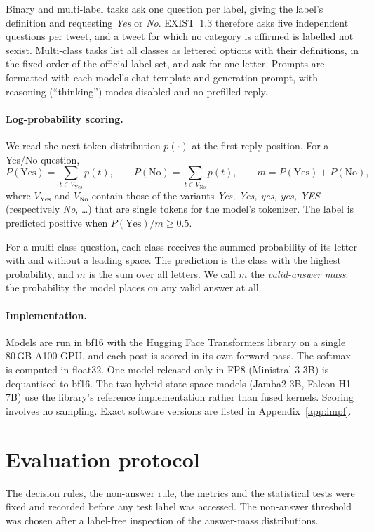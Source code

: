 \documentclass[11pt]{article}
\begin{document}
Binary and multi-label tasks ask one question per label, giving the label's definition and requesting \emph{Yes} or \emph{No}. EXIST~1.3 therefore asks five independent questions per tweet, and a tweet for which no category is affirmed is labelled not sexist. Multi-class tasks list all classes as lettered options with their definitions, in the fixed order of the official label set, and ask for one letter. Prompts are formatted with each model's chat template and generation prompt, with reasoning (``thinking'') modes disabled and no prefilled reply.

\paragraph{Log-probability scoring.} We read the next-token distribution $p(\cdot)$ at the first reply position. For a Yes/No question,
\begin{equation*}
P(\text{Yes}) = \sum_{t \in V_{\text{Yes}}} p(t), \qquad P(\text{No}) = \sum_{t \in V_{\text{No}}} p(t), \qquad m = P(\text{Yes}) + P(\text{No}),
\end{equation*}
where $V_{\text{Yes}}$ and $V_{\text{No}}$ contain those of the variants \emph{Yes, \textvisiblespace Yes, yes, \textvisiblespace yes, YES} (respectively \emph{No}, \dots) that are single tokens for the model's tokenizer. The label is predicted positive when $P(\text{Yes})/m \geq 0.5$.

For a multi-class question, each class receives the summed probability of its letter with and without a leading space. The prediction is the class with the highest probability, and $m$ is the sum over all letters. We call $m$ the \emph{valid-answer mass}: the probability the model places on any valid answer at all.

\paragraph{Implementation.} Models are run in bf16 with the Hugging Face Transformers library on a single 80\,GB A100 GPU, and each post is scored in its own forward pass. The softmax is computed in float32. One model released only in FP8 (Ministral-3-3B) is dequantised to bf16. The two hybrid state-space models (Jamba2-3B, Falcon-H1-7B) use the library's reference implementation rather than fused kernels. Scoring involves no sampling. Exact software versions are listed in Appendix~\ref{app:impl}.

\section{Evaluation protocol}\label{sec:protocol}
The decision rules, the non-answer rule, the metrics and the statistical tests were fixed and recorded before any test label was accessed. The non-answer threshold was chosen after a label-free inspection of the answer-mass distributions.
\end{document}
